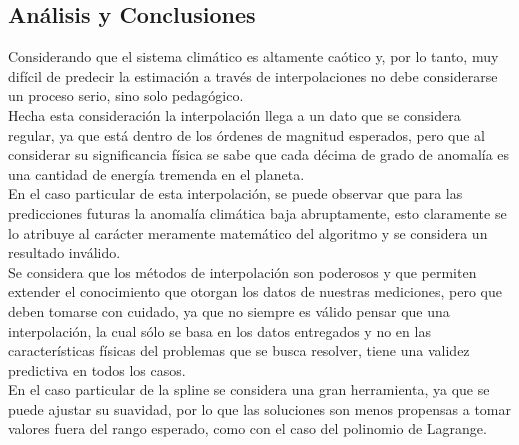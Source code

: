 \documentclass[10pt,a4paper]{article}
\begin{document}
\subsection{Análisis y Conclusiones}
Considerando que el sistema climático es altamente caótico y, por lo tanto, muy difícil de predecir la estimación a través de interpolaciones no debe considerarse un proceso serio, sino solo pedagógico.\\
Hecha esta consideración la interpolación llega a un dato que se considera regular, ya que está dentro de los órdenes de magnitud esperados, pero que al considerar su significancia física se sabe que cada décima de grado de anomalía es una cantidad de energía tremenda en el planeta.\\
En el caso particular de esta interpolación, se puede observar que para las predicciones futuras la anomalía climática baja abruptamente, esto claramente se lo atribuye al carácter meramente matemático del algoritmo y se considera un resultado inválido.\\
Se considera que los métodos de interpolación son poderosos y que permiten extender el conocimiento que otorgan los datos de nuestras mediciones, pero que deben tomarse con cuidado, ya que no siempre es válido pensar que una interpolación, la cual sólo se basa en los datos entregados y no en las características físicas del problemas que se busca resolver, tiene una validez predictiva en todos los casos.\\
En el caso particular de la spline se considera una gran herramienta, ya que se puede ajustar su suavidad, por lo que las soluciones son menos propensas a tomar valores fuera del rango esperado, como con el caso del polinomio de Lagrange.
\end{document}
